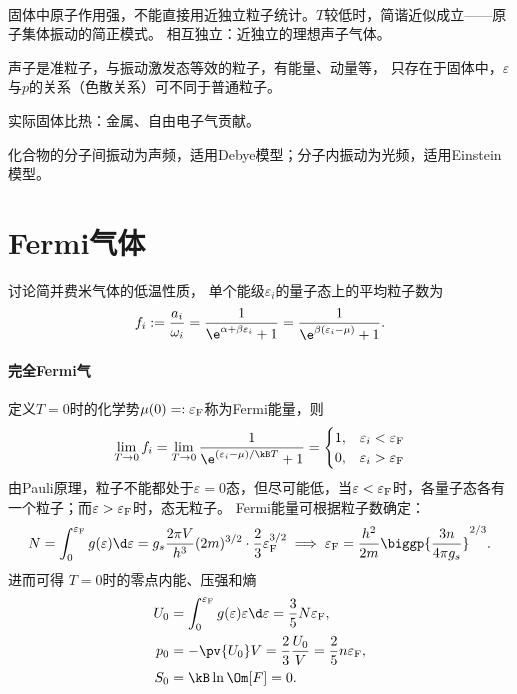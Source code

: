 \begin{remark}
	~
\begin{compactenum}
	\item 固体中原子作用强，不能直接用近独立粒子统计。$T$较低时，简谐近似成立——原子集体振动的简正模式。
	相互独立：近独立的理想声子气体。
	\item 声子是准粒子，与振动激发态等效的粒子，有能量、动量等，
	只存在于固体中，$\varepsilon$与$p$的关系（色散关系）可不同于普通粒子。
	\item 实际固体比热：金属、自由电子气贡献。

	化合物的分子间振动为声频，适用Debye模型；分子内振动为光频，适用Einstein模型。
\end{compactenum}
\end{remark}

\section{Fermi气体}

讨论简并费米气体的低温性质，
单个能级$\varepsilon_i$的量子态上的平均粒子数为
\[
	f_i:=\frac{a_i}{\omega_i}=\frac1{\e^{\alpha+\beta\varepsilon_i}+1}=\frac1{\e^{\beta(\varepsilon_i-\mu)}+1}.
\]

\paragraph{完全Fermi气}

定义$T=0$时的化学势$\mu(0)=:\varepsilon_\mathrm F$称为Fermi能量，则
\[
	\lim_{T\to0}f_i=\lim_{T\to0}\frac1{\e^{(\varepsilon_i-\mu)/\kB T}+1}=
	\begin{cases}
		1,&\varepsilon_i<\varepsilon_\Fm\\
		0,&\varepsilon_i>\varepsilon_\Fm
	\end{cases}
\]
由Pauli原理，粒子不能都处于$\varepsilon=0$态，但尽可能低，当$\varepsilon<\varepsilon_\mathrm F$时，各量子态各有一个粒子；而$\varepsilon>\varepsilon_\mathrm F$时，态无粒子。
Fermi能量可根据粒子数确定：
\begin{equation}
	N=\int_0^{\varepsilon_\Fm}g(\varepsilon)\d\varepsilon=g_s\frac{2\pi V}{h^3}(2m)^{3/2}\cdot\frac23\varepsilon_\Fm^{3/2}
	\implies
	\varepsilon_\Fm=\frac{h^2}{2m}\biggp{\frac{3n}{4\pi g_s}}^{2/3}.
\end{equation}
进而可得
$T=0$时的零点内能、压强和熵
\begin{subequations}
	\begin{align}
		U_0&=\int_0^{\varepsilon_\Fm}g(\varepsilon)\varepsilon\d\varepsilon=\frac35N\varepsilon_\Fm,\\
		p_0&=-\pv{U_0}V=\frac23\frac{U_0}V=\frac25n\varepsilon_\Fm,\\
		S_0&=\kB\ln\Om[F]=0.
	\end{align}
\end{subequations}

